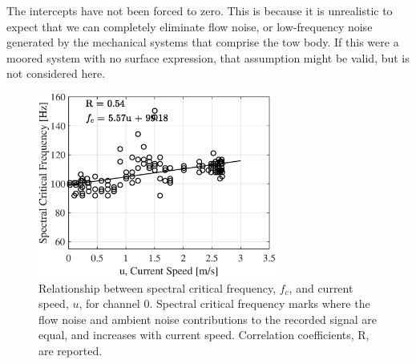\documentclass[12pt,journal,onecolumn]{IEEEtran}
\begin{document}
The intercepts have not been forced to zero. This is because it is unrealistic to expect that we can completely eliminate flow noise, or low-frequency noise generated by the mechanical systems that comprise the tow body. If this were a moored system with no surface expression, that assumption might be valid, but is not considered here. %
\begin{figure}[!t]
	\begin{center}
		\includegraphics[width=0.7\textwidth]{figure4.eps} %
	\end{center}
	\caption[Spectral slope thresholding results]{
	\label{f:thresh}
	Relationship between spectral critical frequency, $f_c$, and current speed, $u$, for channel 0. Spectral critical frequency marks where the flow noise and ambient noise contributions to the recorded signal are equal, and increases with current speed. Correlation coefficients, R, are reported.}
\end{figure}
\end{document}
